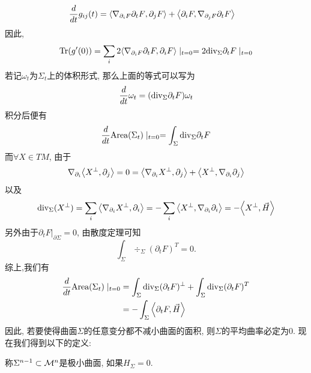 \begin{equation}
    \begin{split}
        \frac{d}{dt} g_{ij}(t) & ={\left < \nabla_{\partial_i F}{\partial_tF}, \partial_jF \right >}+ {\left < \partial_iF, \nabla_{\partial_jF}\partial_tF \right >}
    \end{split}
\end{equation}
因此,
\begin{equation}
    \text{Tr}(g'(0))=\sum_i 2{\left < \nabla_{\partial_iF}\partial_tF, \partial_iF \right >} \mid_{t=0}=2{\text{div}}_\Sigma \partial_tF\mid_{t=0}
\end{equation}
若记$\omega_t$为$\Sigma_t$上的体积形式, 那么上面的等式可以写为
\begin{equation} \label{first_variation_local}
    \frac{d}{dt} \omega_t =({\text{div}}_\Sigma \partial_t F)\omega_t
\end{equation}
积分后便有
\begin{equation}
    \frac{d}{dt} \text{Area}(\Sigma_t)\mid_{t=0}=\int_\Sigma {\text{div}}_\Sigma \partial_t F
\end{equation}
而$\forall X \in TM$, 由于
\begin{equation}
    \nabla_{\partial_i}{\left < X^\perp, \partial_j \right >}=0={\left < \nabla_{\partial_i}X^\perp, \partial_j \right >}+{\left < X^\perp, \nabla_{\partial_i}\partial_j \right >}
\end{equation}
以及 
\begin{equation}
    {\text{div}}_\Sigma(X^\perp)=\sum_i{\left < \nabla_{\partial_i}X^\perp, \partial_i \right >}=-\sum_i{\left < X^\perp, \nabla_{\partial_i}\partial_i \right >}=-{\left < X^\perp, \vec{H} \right >}
\end{equation}
另外由于$\partial_tF|_{\partial \Sigma}=0$, 由散度定理可知
\begin{equation}
        \int_\Sigma \div_{\Sigma}(\partial_tF)^T =0.
\end{equation}
综上,我们有
\begin{equation}
    \begin{split}
        \frac{d}{dt} \text{Area}(\Sigma_t)\mid_{t=0} & = \int_\Sigma {\text{div}}_{\Sigma}(\partial_tF)^\perp + \int_\Sigma {\text{div}}_{\Sigma}(\partial_tF)^T \\
        &=-\int_\Sigma{\left < \partial_tF, \vec{H} \right >}
    \end{split}
\end{equation}
因此, 若要使得曲面$\Sigma$的任意变分都不减小曲面的面积, 则$\Sigma$的平均曲率必定为0. 现在我们得到以下的定义:
\begin{definition}
    称$\Sigma^{n-1} \subset {\mathcal{M}}^n$是极小曲面, 如果$H_\Sigma=0$.
\end{definition}

